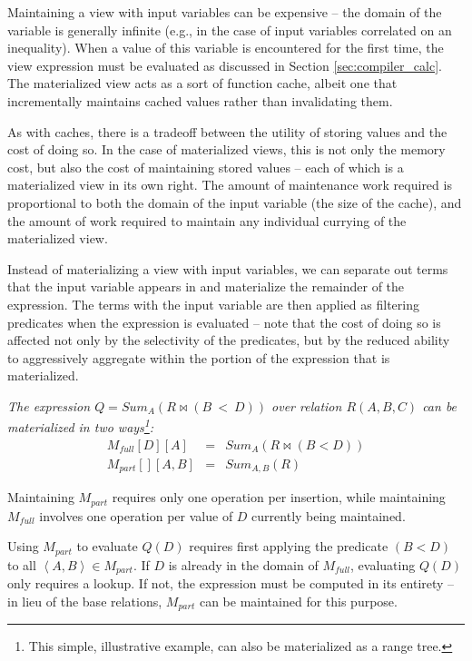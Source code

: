 Maintaining a view with input variables can be expensive -- the domain of the variable is generally infinite (e.g., in the case of input variables correlated on an inequality).  When a value of this variable is encountered for the first time, the view expression must be evaluated as discussed in Section \ref{sec:compiler_calc}.  The materialized view acts as a sort of function cache, albeit one that incrementally maintains cached values rather than invalidating them.

As with caches, there is a tradeoff between the utility of storing values and the cost of doing so.  In the case of materialized views, this is not only the memory cost, but also the cost of maintaining stored values -- each of which is a materialized view in its own right.  The amount of maintenance work required is proportional to both the domain of the input variable (the size of the cache), and the amount of work required to maintain any individual currying of the materialized view.  

Instead of materializing a view with input variables, we can separate out terms that the input variable appears in and materialize the remainder of the expression.  The terms with the input variable are then applied as filtering predicates when the expression is evaluated -- note that the cost of doing so is  affected not only by the selectivity of the predicates, but by the reduced ability to aggressively aggregate within the portion of the expression that is materialized.

\begin{example} \em
The expression $Q = Sum_A(R \bowtie (B~<~D))$ over relation $R(A,B,C)$ can be materialized in two ways\footnote{This simple, illustrative example, can also be materialized as a range tree.}:
{\small \begin{eqnarray*}
M_{full}[D][A] & = & Sum_A(R \bowtie (B < D)) \\
M_{part}[][A,B] & = & Sum_{A,B}(R)
\end{eqnarray*}}
\end{example}

Maintaining $M_{part}$ requires only one operation per insertion, while maintaining $M_{full}$ involves one operation per value of $D$ currently being maintained.  

Using $M_{part}$ to evaluate $Q(D)$ requires first applying the predicate $(B < D)$ to all $\left<A,B\right> \in M_{part}$.  If $D$ is already in the domain of $M_{full}$, evaluating $Q(D)$ only requires a lookup.  If not, the expression must be computed in its entirety -- in lieu of the base relations, $M_{part}$ can be maintained for this purpose.

